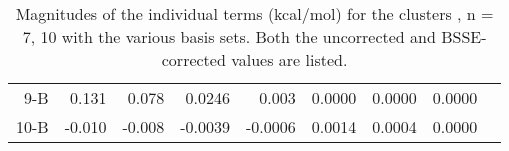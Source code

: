 \begin{table}[]
\begin{tabular}{@{}rrrrrrrrr@{}}
9-B  & 0.131   & 0.078   & 0.0246  & 0.003     & 0.0000  & 0.0000  & 0.0000  &           \\
10-B & -0.010  & -0.008  & -0.0039 & -0.0006   & 0.0014  & 0.0004  & 0.0000  &           \\ \bottomrule
\end{tabular}
\caption[Magnitudes of the individual terms (kcal/mol) for the clusters , n = 7, 10 with the various basis sets. Both the uncorrected and BSSE-corrected values are listed.]{Magnitudes of the individual terms (kcal/mol) for the clusters , n = 7, 10 with the various basis sets. Both the uncorrected and BSSE-corrected values are listed.}
\label{tab:MBE_I_T1}
\end{table}
